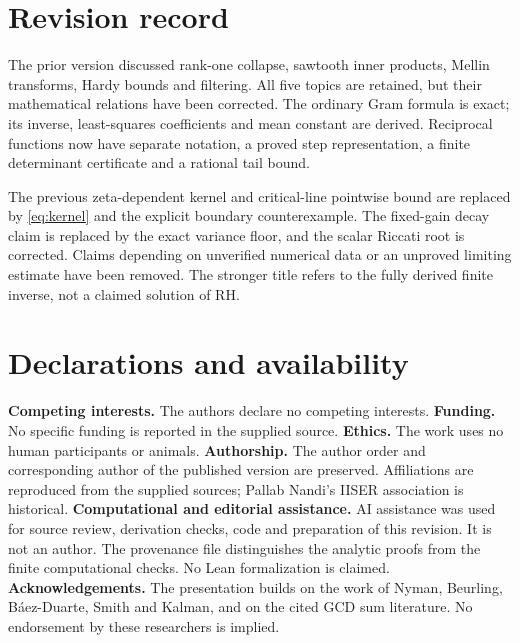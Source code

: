 \documentclass[11pt]{amsart}
\theoremstyle{definition}
\begin{document}
\section{Revision record}
The prior version \cite{Previous} discussed rank-one collapse,
sawtooth inner products, Mellin transforms, Hardy bounds and filtering.
All five topics are retained, but their mathematical relations have
been corrected. The ordinary Gram formula is exact; its inverse,
least-squares coefficients and mean constant are derived. Reciprocal
functions now have separate notation, a proved step representation,
a finite determinant certificate and a rational tail bound.

The previous zeta-dependent kernel and critical-line pointwise bound
are replaced by \eqref{eq:kernel} and the explicit boundary
counterexample. The fixed-gain decay claim is replaced by the exact
variance floor, and the scalar Riccati root is corrected. Claims
depending on unverified numerical data or an unproved limiting
estimate have been removed. The stronger title refers to the fully
derived finite inverse, not a claimed solution of RH.

\section*{Declarations and availability}
\textbf{Competing interests.} The authors declare no competing interests.
\textbf{Funding.} No specific funding is reported in the supplied source.
\textbf{Ethics.} The work uses no human participants or animals.
\textbf{Authorship.} The author order and corresponding author of the
published version are preserved. Affiliations are reproduced from the
supplied sources; Pallab Nandi's IISER association is historical.
\textbf{Computational and editorial assistance.} AI assistance was used
for source review, derivation checks, code and preparation of this
revision. It is not an author. The provenance file distinguishes the
analytic proofs from the finite computational checks. No Lean
formalization is claimed.
\textbf{Acknowledgements.} The presentation builds on the work of
Nyman, Beurling, B\'aez-Duarte, Smith and Kalman, and on the cited GCD
sum literature. No endorsement by these researchers is implied.

\end{document}
